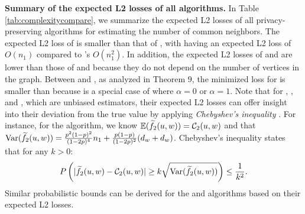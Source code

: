 \noindent
{\bf Summary of the expected L2 losses of all algorithms.} 
{
In Table \ref{tab:complexitycompare}, we summarize the expected L2 losses of all privacy-preserving algorithms for estimating the number of common neighbors. 
The expected L2 loss of \bs is smaller than that of \naive, with \bs having an expected L2 loss of $O(n_1)$ compared to \naive's $O(n_1^2)$. 
In addition, the expected L2 losses of \advss and \advds are lower than those of \naive and \bs because they do not depend on the number of vertices in the graph. 
Between \advds and \advss, as analyzed in Theorem 9, the minimized loss for \advds is smaller than \advss because \advss is a special case of \advds where $\alpha = 0$ or $\alpha = 1$. 
Note that for \bs, \advss, and \advds, which are unbiased estimators, their expected L2 losses can offer insight into their deviation from the true value by applying \emph{Chebyshev's inequality} \cite{saw1984chebyshev}. 
For instance, for the \bs algorithm, we know $\mathbb{E}(\widetilde{f}_2(u, w)) = \mathcal{C}_2(u,w)$ and that $\mathrm{Var}(\widetilde{f}_2(u, w)) = \frac{p^2(1-p)^2}{(1-2p)^4} n_1
    + \frac{p(1-p)}{(1-2p)^2}(d_w + d_w ) $. 
Chebyshev's inequality states that for any $k >0$: 
$$
P\left(|\widetilde{f}_2(u, w) - \mathcal{C}_2(u,w)| \geq k \sqrt{\mathrm{Var}(\widetilde{f}_2(u, w))} \right) \leq \frac{1}{k^2}.
$$
Similar probabilistic bounds can be derived for the \advss and \advds algorithms based on their expected L2 losses.}




% 


